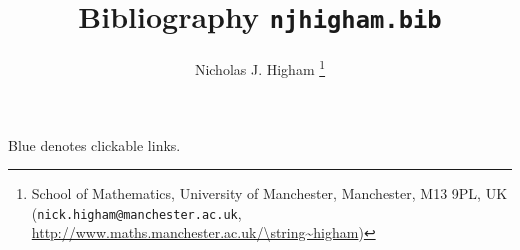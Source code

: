 \documentclass[12pt]{article}
\title{Bibliography \texttt{njhigham.bib}}
\author{Nicholas J. Higham%
        \thanks{%
                School of Mathematics,
                University of Manchester,
                Manchester, M13 9PL, UK 
                (\texttt{nick.higham@manchester.ac.uk},
                \url{http://www.maths.manchester.ac.uk/\string~higham})
               }
}
\begin{document}
\maketitle
Blue denotes clickable links.


\nocite{*}

% 

% 

\end{document}
